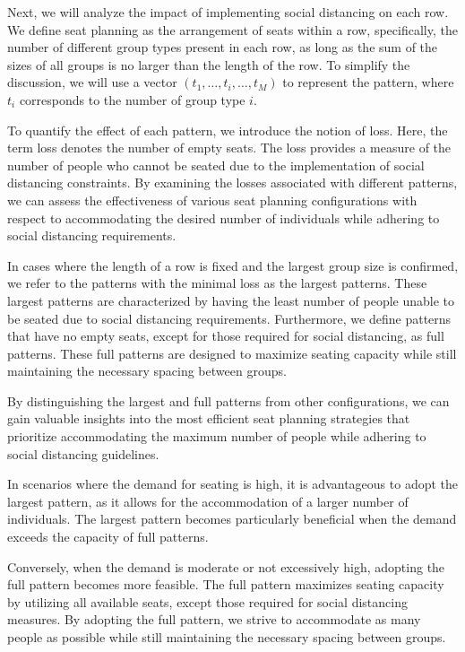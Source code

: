 

Next, we will analyze the impact of implementing social distancing on each row. We define seat planning as the arrangement of seats within a row, specifically, the number of different group types present in each row, as long as the sum of the sizes of all groups is no larger than the length of the row. To simplify the discussion, we will use a vector $(t_1, \ldots, t_i, \ldots, t_M)$ to represent the pattern, where $t_i$ corresponds to the number of group type $i$.

To quantify the effect of each pattern, we introduce the notion of loss. Here, the term loss denotes the number of empty seats. The loss provides a measure of the number of people who cannot be seated due to the implementation of social distancing constraints. By examining the losses associated with different patterns, we can assess the effectiveness of various seat planning configurations with respect to accommodating the desired number of individuals while adhering to social distancing requirements. 

In cases where the length of a row is fixed and the largest group size is confirmed, we refer to the patterns with the minimal loss as the largest patterns. These largest patterns are characterized by having the least number of people unable to be seated due to social distancing requirements. Furthermore, we define patterns that have no empty seats, except for those required for social distancing, as full patterns. These full patterns are designed to maximize seating capacity while still maintaining the necessary spacing between groups.

By distinguishing the largest and full patterns from other configurations, we can gain valuable insights into the most efficient seat planning strategies that prioritize accommodating the maximum number of people while adhering to social distancing guidelines.

In scenarios where the demand for seating is high, it is advantageous to adopt the largest pattern, as it allows for the accommodation of a larger number of individuals. The largest pattern becomes particularly beneficial when the demand exceeds the capacity of full patterns.

Conversely, when the demand is moderate or not excessively high, adopting the full pattern becomes more feasible. The full pattern maximizes seating capacity by utilizing all available seats, except those required for social distancing measures. By adopting the full pattern, we strive to accommodate as many people as possible while still maintaining the necessary spacing between groups.

